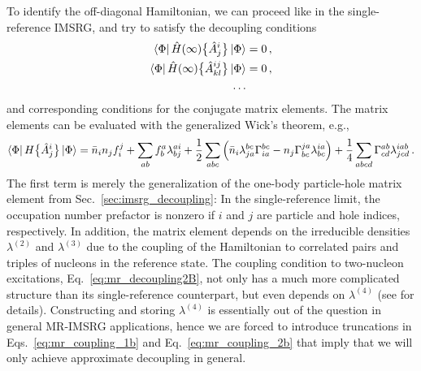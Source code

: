 To identify the off-diagonal Hamiltonian, we can proceed like in the
single-reference IMSRG, and try to satisfy the decoupling conditions
\begin{align}
  \matrixe{\Phi}{\HO(\infty)\nord{\AO^{i}_{j}}}{\Phi}&=0\,,\label{eq:mr_decoupling1B}\\
  \matrixe{\Phi}{\HO(\infty)\nord{\AO^{ij}_{kl}}}{\Phi}&=0\,,\label{eq:mr_decoupling2B}\\
  \ldots& \notag
\end{align}
and corresponding conditions for the conjugate matrix elements. The 
matrix elements can be evaluated with the generalized Wick's theorem, 
e.g.,
\begin{align}
  \dmatrixe{\Phi}{H\nord{\AO^{i}_{j}}}
  =\nn_i n_j f^{j}_{i}+\sum_{ab}f^{a}_{b}\lambda^{ai}_{bj}
   +\frac{1}{2}\sum_{abc} 
    \left( \nn_i \lambda^{bc}_{ja}\Gamma^{bc}_{ia} - n_j \Gamma^{ja}_{bc} \lambda^{ia}_{bc} \right)
   +\frac{1}{4}\sum_{abcd}\Gamma^{ab}_{cd}\lambda^{iab}_{jcd}\,.\label{eq:mr_coupling_1b}
\end{align}
The first term is merely the generalization of the one-body
particle-hole matrix element from Sec.~\ref{sec:imsrg_decoupling}: In the 
single-reference limit, the occupation number prefactor is nonzero if $i$ and
$j$ are particle and hole indices, respectively. In addition, the matrix
element depends on the irreducible densities $\lambda^{(2)}$ and $\lambda^{(3)}$
due to the coupling of the Hamiltonian to correlated pairs and triples of nucleons 
in the reference state. The coupling condition to two-nucleon excitations, 
Eq.~\eqref{eq:mr_decoupling2B}, not only has a much more complicated 
structure than its single-reference counterpart, but even depends
on $\lambda^{(4)}$ (see \cite{Hergert:2017kx} for details).
Constructing and storing $\lambda^{(4)}$ is essentially out
of the question in general MR-IMSRG applications, hence we 
are forced to introduce truncations in Eqs.~\eqref{eq:mr_coupling_1b} 
and Eq.~\eqref{eq:mr_coupling_2b} that imply that we will only
achieve approximate decoupling in general.

